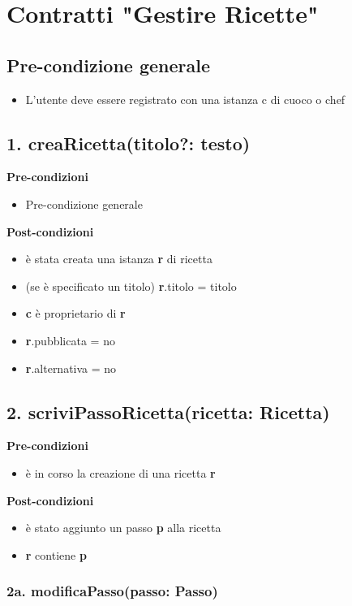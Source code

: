 
\section{Contratti "Gestire Ricette"}

\subsection*{Pre-condizione generale}
\begin{itemize}
  \item L'utente deve essere registrato con una istanza c di cuoco o chef
\end{itemize}

\subsection*{1. creaRicetta(titolo?: testo)}
\textbf{Pre-condizioni}
\begin{itemize}
  \item Pre-condizione generale
\end{itemize}
\textbf{Post-condizioni}
\begin{itemize}
  \item è stata creata una istanza \textbf{r} di ricetta
  \item (se è specificato un titolo) \textbf{r}.titolo = titolo
  \item \textbf{c} è proprietario di \textbf{r}
  \item \textbf{r}.pubblicata = no
  \item \textbf{r}.alternativa = no
\end{itemize}

\subsection*{2. scriviPassoRicetta(ricetta: Ricetta)}

\textbf{Pre-condizioni} 	
\begin{itemize}
  \item è in corso la creazione di una ricetta  \textbf{r}
\end{itemize}
\textbf{Post-condizioni}
\begin{itemize}
  \item è stato aggiunto un passo  \textbf{p} alla ricetta
  \item  \textbf{r} contiene  \textbf{p}
\end{itemize}

\subsubsection*{2a. modificaPasso(passo: Passo)}

